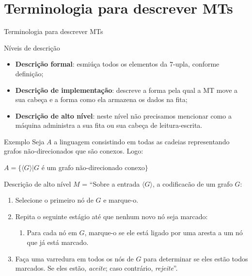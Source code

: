 \documentclass[xcolor=dvipsnames,table]{beamer}
\begin{document}
	\section{Terminologia para descrever MTs}
	\begin{frame}{Terminologia para descrever MTs}
		\begin{block}{Níveis de descrição}
			\begin{itemize}
				\item<1,4> {\bf Descrição formal}: esmiúça todos os elementos da 7-upla, conforme definição;
				\item<2,4> {\bf Descrição de implementação}: descreve a forma pela qual a MT move a sua cabeça e a forma como ela armazena os dados na fita;
				\item<3,4> {\bf Descrição de alto nível}: neste nível não precisamos mencionar como a máquina administra a sua fita ou sua cabeça de leitura-escrita.
			\end{itemize}
		\end{block}
	\end{frame}
	
	\begin{frame}[shrink]{Exemplo}
		Seja $A$ a linguagem consistindo em todas as cadeias representando grafos não-direcionados que são conexos. Logo:
		\begin{center}
			$A = \{\langle G \rangle | G$ é um grafo não-direcionado conexo$\}$
		\end{center}\pause		
		\begin{block}{Descrição de alto nível}
			$M$ = ``Sobre a entrada $\langle G \rangle$, a codificacão de um grafo $G$:
			\begin{enumerate}
				\item Selecione o primeiro nó de $G$ e marque-o.
				\item Repita o seguinte estágio até que nenhum novo nó seja marcado:
					\begin{enumerate}
						\item Para cada nó em $G$, marque-o se ele está ligado por uma aresta a um nó que já está marcado.
					\end{enumerate}
				\item Faça uma varredura em todos os nós de $G$ para determinar se eles estão todos marcados. Se eles estão, {\it aceite}; caso contrário, {\it rejeite}''.
			\end{enumerate}
		\end{block}
	\end{frame}
	
\end{document}

